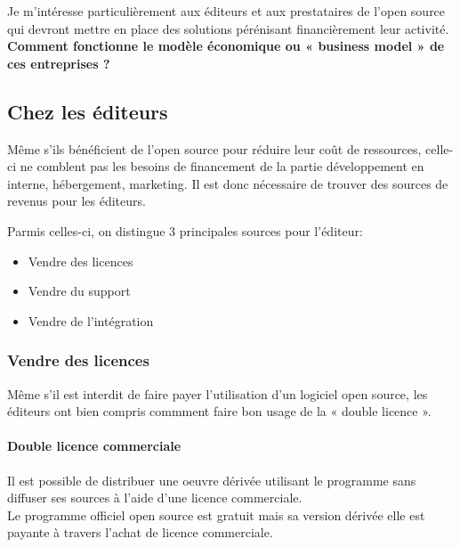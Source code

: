 			Je m'intéresse particulièrement aux éditeurs et aux prestataires de l'open source qui devront mettre en place des solutions pérénisant financièrement leur activité.\\

			\textbf{Comment fonctionne le modèle économique ou « business model » de ces entreprises ?}\\

		\subsection{Chez les éditeurs}

			Même s'ils bénéficient de l'open source pour réduire leur coût de ressources, celle-ci ne comblent pas les besoins de financement de la partie développement en interne, hébergement, marketing. Il est donc nécessaire de trouver des sources de revenus pour les éditeurs.

			Parmis celles-ci, on distingue 3 principales sources pour l'éditeur:

			\begin{itemize}[label=\textbullet, font=\LARGE \color{burntorange}]
				\item Vendre des licences
				\item Vendre du support
				\item Vendre de l'intégration
			\end{itemize}

			\subsubsection{Vendre des licences}

			Même s'il est interdit de faire payer l'utilisation d'un logiciel open source, les éditeurs ont bien compris commment faire bon usage de la « double licence ».

			\paragraph{Double licence commerciale\\}

			Il est possible de distribuer une oeuvre dérivée utilisant le programme sans diffuser ses sources à l'aide d'une licence commerciale.\\
			Le programme officiel open source est gratuit mais sa version dérivée elle est payante à travers l'achat de licence commerciale.\\

